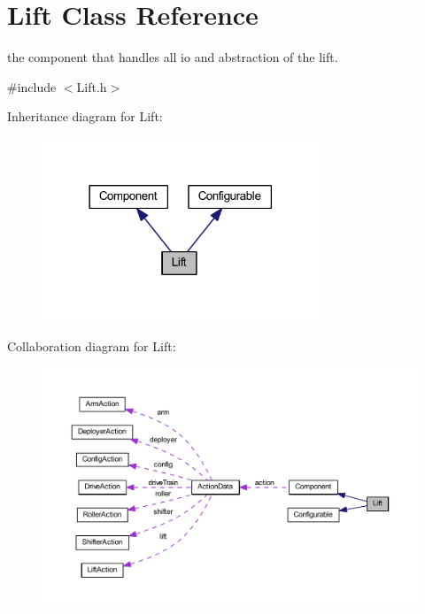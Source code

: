 \hypertarget{class_lift}{
\section{\-Lift \-Class \-Reference}
\label{class_lift}
}


the component that handles all io and abstraction of the lift.  




{\ttfamily \#include $<$\-Lift.\-h$>$}



\-Inheritance diagram for \-Lift\-:\nopagebreak
\begin{figure}[H]
\begin{center}
\leavevmode
\includegraphics[width=234pt]{class_lift__inherit__graph}
\end{center}
\end{figure}


\-Collaboration diagram for \-Lift\-:\nopagebreak
\begin{figure}[H]
\begin{center}
\leavevmode
\includegraphics[width=350pt]{class_lift__coll__graph}
\end{center}
\end{figure}
